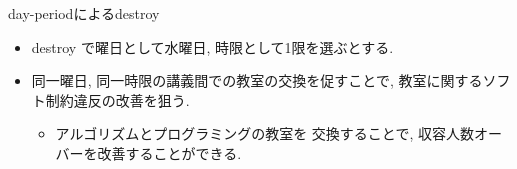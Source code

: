 \documentclass[11pt,dvipdfmx]{beamer}
\begin{document}
\begin{frame}{day-periodによるdestroy}
  \begin{itemize}
   \item \small destroy で曜日として水曜日, 時限として1限を選ぶとする. 
   \item \small 同一曜日, 同一時限の講義間での教室の交換を促すことで, 
   教室に関するソフト制約違反の改善を狙う. 
   \begin{itemize}
    \item アルゴリズムとプログラミングの教室を
    交換することで, 収容人数オーバーを改善することができる. 
   \end{itemize}
  \end{itemize}
\end{frame}
\end{document}
